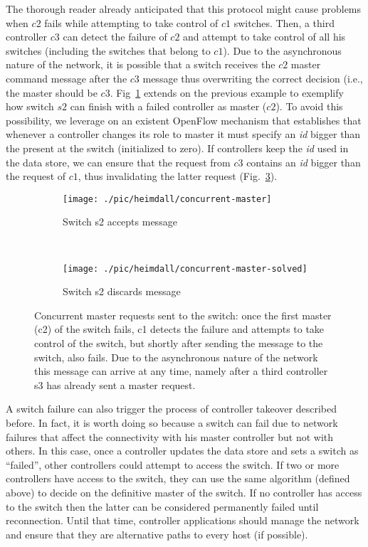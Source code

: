 The thorough reader already anticipated that this protocol might cause problems when $c2$ fails while attempting to take control of $c1$ switches. 
Then, a third controller $c3$ can detect the failure of $c2$ and attempt to take control of all his switches (including  the switches that belong to $c1$). 
Due to the asynchronous nature of the network, it is possible that a switch receives  the $c2$ master command message after the  $c3$ message thus overwriting the correct decision (i.e., the master should be $c3$. 
Fig~\ref{fig:concurrent-master-accept} extends on the previous example to exemplify how switch $s2$ can finish with a failed controller as master ($c2$). 
To avoid this possibility, we leverage on an existent OpenFlow mechanism that establishes that whenever a controller changes its role to master it must specify an \emph{id} bigger than the present at the switch (initialized to zero). 
If controllers keep the \emph{id} used in the data store, we can ensure that the request from $c3$ contains an \emph{id} bigger than the request of $c1$, thus invalidating  the latter request (Fig.~\ref{fig:concurrent-master-discard}).  



\begin{figure}
  \centering
\begin{subfigure}[b]{0.5\textwidth}
  \centering
  \texttt{[image: ./pic/heimdall/concurrent-master]}
  \caption{Switch s2 accepts message}
\label{fig:concurrent-master-accept}
\end{subfigure}%
        ~
        \begin{subfigure}[b]{0.5\textwidth}
                \centering
                \texttt{[image: ./pic/heimdall/concurrent-master-solved]}
                \caption{Switch s2 discards message}
\label{fig:concurrent-master-discard}
        \end{subfigure}
        \caption[Concurrent masters.]{Concurrent master requests sent to the switch: once the first master (c2) of the switch fails, c1 detects the failure and attempts to take control of the switch, but shortly after sending the message to the switch, also fails. Due to the asynchronous nature of the network this message can arrive at any time, namely after a third controller s3 has already sent a master request.}
\end{figure}

A switch failure can also trigger the process of controller takeover described before. 
In fact, it is worth doing so because a switch can fail due to network failures that affect the connectivity with his master controller but not with others.  
In this case, once  a controller updates the data store and sets a switch as ``failed'', other controllers could attempt to access the switch.
If two or more controllers have access to the switch, they can use the same algorithm (defined above) to decide on the definitive master of the switch. 
If no controller has access to the switch then the latter can be considered permanently failed until reconnection.
Until that time, controller applications should manage the network and ensure that they are alternative paths to every host (if possible). 

